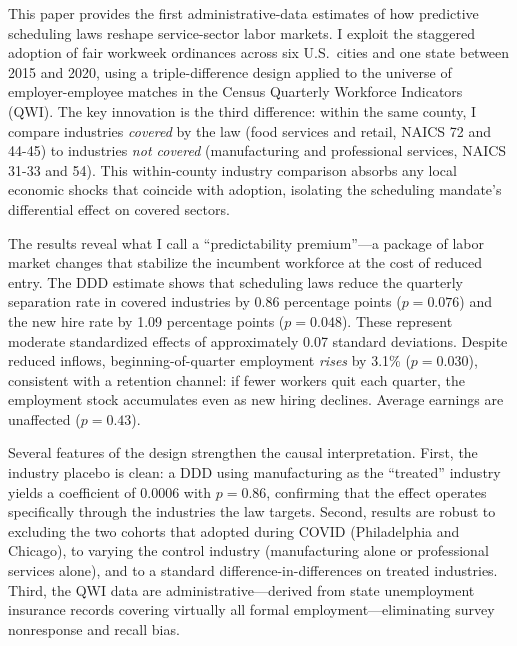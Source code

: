 \documentclass[12pt]{article}
\begin{document}
This paper provides the first administrative-data estimates of how predictive scheduling laws reshape service-sector labor markets. I exploit the staggered adoption of fair workweek ordinances across six U.S.\ cities and one state between 2015 and 2020, using a triple-difference design applied to the universe of employer-employee matches in the Census Quarterly Workforce Indicators (QWI). The key innovation is the third difference: within the same county, I compare industries \emph{covered} by the law (food services and retail, NAICS 72 and 44-45) to industries \emph{not covered} (manufacturing and professional services, NAICS 31-33 and 54). This within-county industry comparison absorbs any local economic shocks that coincide with adoption, isolating the scheduling mandate's differential effect on covered sectors.

The results reveal what I call a ``predictability premium''---a package of labor market changes that stabilize the incumbent workforce at the cost of reduced entry. The DDD estimate shows that scheduling laws reduce the quarterly separation rate in covered industries by 0.86 percentage points ($p = 0.076$) and the new hire rate by 1.09 percentage points ($p = 0.048$). These represent moderate standardized effects of approximately 0.07 standard deviations. Despite reduced inflows, beginning-of-quarter employment \emph{rises} by 3.1\% ($p = 0.030$), consistent with a retention channel: if fewer workers quit each quarter, the employment stock accumulates even as new hiring declines. Average earnings are unaffected ($p = 0.43$).

Several features of the design strengthen the causal interpretation. First, the industry placebo is clean: a DDD using manufacturing as the ``treated'' industry yields a coefficient of 0.0006 with $p = 0.86$, confirming that the effect operates specifically through the industries the law targets. Second, results are robust to excluding the two cohorts that adopted during COVID (Philadelphia and Chicago), to varying the control industry (manufacturing alone or professional services alone), and to a standard difference-in-differences on treated industries. Third, the QWI data are administrative---derived from state unemployment insurance records covering virtually all formal employment---eliminating survey nonresponse and recall bias.
\end{document}
